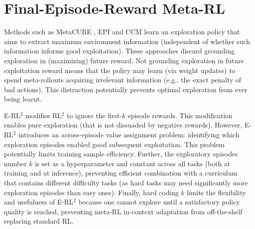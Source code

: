 \documentclass{article}
\begin{document}
\FloatBarrier
\section{Final-Episode-Reward Meta-RL} \label{FinalEpisodeRelated}

Methods such as MetaCURE \citep{metacure}, EPI \citep{EPI} and CCM \citep{CCM} learn an exploration policy that aims to extract maximum environment information (independent of whether such information informs good exploitation). These approaches discard grounding exploration in (maximizing) future reward. Not grounding exploration in future exploitation reward means that the policy may learn (via weight updates) to spend meta-rollouts acquiring irrelevant information (e.g., the exact penalty of bad actions). This distraction potentially prevents optimal exploration from ever being learnt.

E-RL\(^2\) \citep{stadie2019considerations} modifies RL\(^2\) to ignore the first-$k$ episode rewards. This modification enables pure exploration (that is not dissuaded by negative rewards). However, E-RL\(^2\) introduces an across-episode value assignment problem: identifying which exploration episodes enabled good subsequent exploitation. This problem potentially limits training sample efficiency. Further, the exploratory episodes number $k$ is set as a hyperparameter and constant across all tasks (both at training and at inference), preventing efficient combination with a curriculum that contains different difficulty tasks (as hard tasks may need significantly more exploration episodes than easy ones). Finally, hard coding $k$ limits the flexibility and usefulness of E-RL\(^2\) because one cannot explore until a satisfactory policy quality is reached, preventing meta-RL in-context adaptation from off-the-shelf replacing standard RL.
\end{document}
